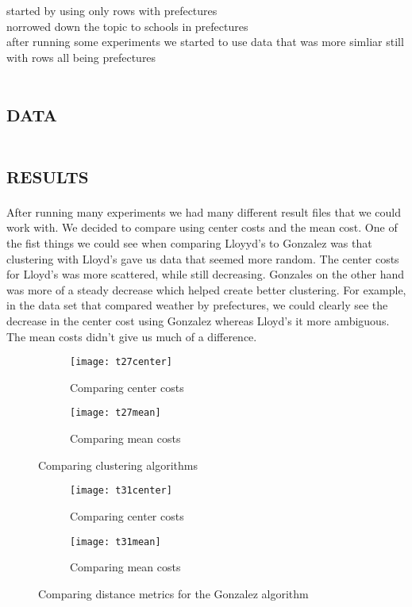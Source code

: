 \documentclass[a4paper, 11pt]{article} %
\begin{document}
started by using only rows with prefectures\\

norrowed down the topic to schools in prefectures\\

after running some experiments we started to use data that was more simliar still with rows all being prefectures\\

\section{\textsc{data}}




\section{\textsc{results}}

After running many experiments we had many different result files that we could work with. We decided to compare using center costs and the mean cost. One of the fist things we could see when comparing Lloyyd's to Gonzalez was that clustering with Lloyd's gave us data that seemed more random. The center costs for Lloyd's was more scattered, while still decreasing. Gonzales on the other hand was more of a steady decrease which helped create better clustering. For example, in the data set that compared weather by prefectures, we could clearly see the decrease in the center cost using Gonzalez whereas Lloyd's it more ambiguous. The mean costs didn't give us much of a difference.


\begin{figure}[H]
\centering
\begin{subfigure}{.5\textwidth}
  \centering
  \texttt{[image: t27center]}
  \caption{Comparing center costs}
  \label{center_cluster_costs}
\end{subfigure}%
\begin{subfigure}{.5\textwidth}
  \centering
  \texttt{[image: t27mean]}
  \caption{Comparing mean costs}
  \label{mean_cluster_costs}
\end{subfigure}
\caption{Comparing clustering algorithms}
\label{cluster_compare}
\end{figure}

\begin{figure}[H]
\centering
\begin{subfigure}{.5\textwidth}
  \centering
  \texttt{[image: t31center]}
  \caption{Comparing center costs}
  \label{center_distance_costs}
\end{subfigure}%
\begin{subfigure}{.5\textwidth}
  \centering
  \texttt{[image: t31mean]}
  \caption{Comparing mean costs}
  \label{mean_distance_costs}
\end{subfigure}
\caption{Comparing distance metrics for the Gonzalez algorithm}
\label{cluster_compare}
\end{figure}
\end{document}
